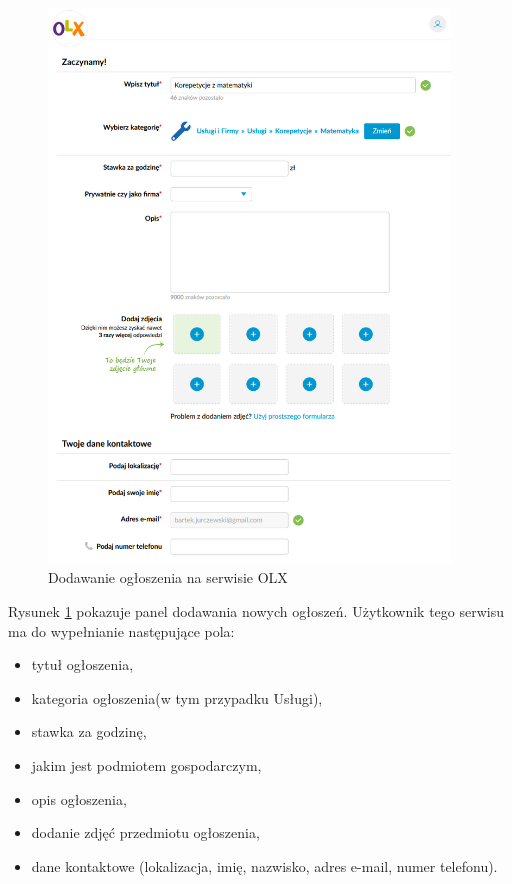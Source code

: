 \documentclass[12pt]{article}
\numberwithin{figure}{section}
\begin{document}
\begin{sloppypar}
    \begin{figure}[!htbp]
    	\centering
    	\includegraphics[width=0.95\textwidth]{images/chapter_2/olx-add-announcement.png}
    	\caption{Dodawanie ogłoszenia na serwisie OLX}
    	\label{fig:olx-add-announcement}
    \end{figure}

Rysunek \ref{fig:olx-add-announcement} pokazuje panel dodawania nowych ogłoszeń. 
Użytkownik tego serwisu ma do wypełnianie następujące pola:
\begin{itemize}
    \item tytuł ogłoszenia,
    \item kategoria ogłoszenia(w tym przypadku Usługi),
    \item stawka za godzinę,
    \item jakim jest podmiotem gospodarczym,
    \item opis ogłoszenia,
    \item dodanie zdjęć przedmiotu ogłoszenia,
    \item dane kontaktowe (lokalizacja, imię, nazwisko, adres e-mail, numer telefonu).
\end{itemize}


\end{sloppypar}
\end{document}
